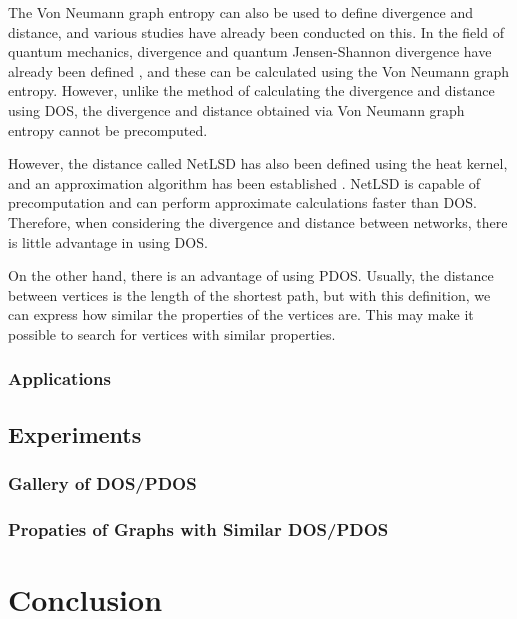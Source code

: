 \documentclass[senior,final,11pt]{iscs-thesis}
\begin{document}
The Von Neumann graph entropy can also be used to define divergence and distance, and various studies have already been conducted on this. In the field of quantum mechanics, divergence and quantum Jensen-Shannon divergence have already been defined \cite{briet2009properties, lamberti2008metric}, and these can be calculated using the Von Neumann graph entropy. However, unlike the method of calculating the divergence and distance using DOS, the divergence and distance obtained via Von Neumann graph entropy cannot be precomputed.

However, the distance called NetLSD has also been defined using the heat kernel, and an approximation algorithm has been established \cite{tsitsulin2018netlsd,tsitsulin2020just}. NetLSD is capable of precomputation and can perform approximate calculations faster than DOS. Therefore, when considering the divergence and distance between networks, there is little advantage in using DOS.

On the other hand, there is an advantage of using PDOS. Usually, the distance between vertices is the length of the shortest path, but with this definition, we can express how similar the properties of the vertices are. This may make it possible to search for vertices with similar properties.

\subsection{Applications}


\section{Experiments}
\subsection{Gallery of DOS/PDOS}
\subsection{Propaties of Graphs with Similar DOS/PDOS}


\begin{comment}
There are fast online search tool for DOS\cite{borysov2018online,geilhufe2018towards}


Motif multiplicity corresponds to eigenvalues multiplicity \cite{mehatari2015effect,dong2019network}.


The eigenvalues of adjacency matrix and the number of closed walks are closely related\cite{butler2008eigenvalues}.
\end{comment}



\chapter{Conclusion}

\end{document}

